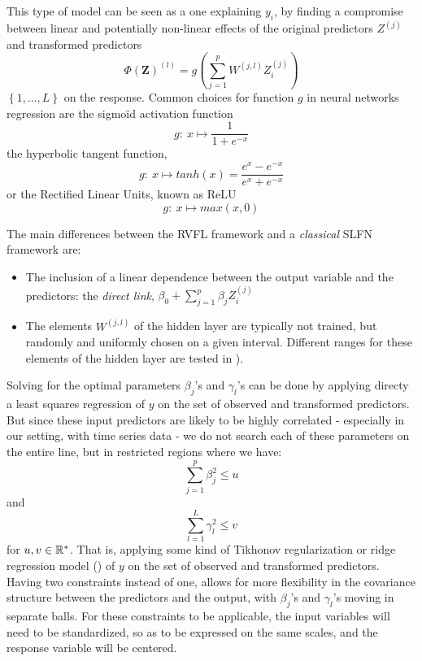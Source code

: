 This type of model can be seen as a one explaining $y_i$, by finding a
compromise between linear and potentially non-linear effects of the original
predictors $Z^{(j)}$ and transformed predictors
$$
\Phi(\textbf{Z})^{(l)}= g\left(\sum_{j = 1}^p W^{(j, l)} Z_i^{(j)}\right)
$$
$\left \lbrace 1, \ldots, L\right\rbrace$ on the response. Common choices for function $g$ in neural networks regression are the sigmoïd activation function
$$
g: \: x \mapsto \frac{1}{1 + e^{-x}}
$$
the hyperbolic tangent function,
$$
g: \: x \mapsto tanh(x) = \frac{e^x - e^{-x}}{e^x + e^{-x}}
$$
or the Rectified Linear Units, known as ReLU
$$
g: \: x \mapsto max(x, 0)
$$

\medskip

The main differences between the RVFL framework and a \textit{classical} SLFN framework are:

\begin{itemize}
\item The inclusion of a linear dependence between the output variable and the
predictors: the \textit{direct link}, $\beta_0 + \sum_{j = 1}^p \beta_j Z_i^{(j)}$
\item The elements $W^{(j, l)}$ of the hidden layer are typically not trained, but randomly and uniformly chosen on a given interval. Different ranges for these elements of the hidden layer are tested in \cite{zhang2016comprehensive}).
\end{itemize}

\medskip

Solving for the optimal parameters $\beta_j$'s and $\gamma_l$'s can be done by applying directy a least squares regression of $y$ on the set of observed and transformed predictors. But since these input predictors are likely to be highly correlated - especially in our setting, with time series data - we do not search each of these parameters on the entire line, but in restricted regions
where we have:
$$
\sum_{j=1}^p \beta_j^2  \leq u
$$
and
$$
\sum_{l=1}^L
\gamma_l^2 \leq v
$$ for $u, v \in \mathbb{R}^*$. That is, applying some kind of Tikhonov regularization or ridge regression model (\cite{hoerl1970ridge}) of $y$ on the set of observed and transformed predictors. Having two constraints instead of one, allows for more flexibility in the covariance structure between the predictors and the output, with $\beta_j$'s and $\gamma_l$'s moving in separate balls. For these constraints to be applicable, the input variables will need to be standardized, so as to be expressed on the same scales, and the response variable will be centered.

